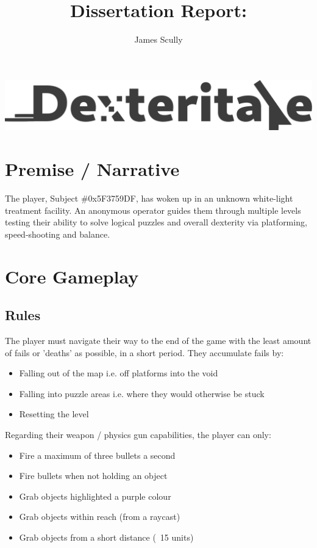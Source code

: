 \documentclass[11pt]{article}
\title{Dissertation Report: \pt}
\author{James Scully}
\begin{document}
\begin{center}
\includegraphics[width=0.75\linewidth]{logo} 
\end{center}

\section{Premise / Narrative}
The player, Subject \#0x5F3759DF, has woken up in an unknown white-light treatment facility. An anonymous operator guides them through multiple levels testing their ability to solve logical puzzles and overall dexterity via platforming, speed-shooting and balance.



\section{Core Gameplay}
\subsection{Rules}
The player must navigate their way to the end of the game with the least amount of fails or 'deaths' as possible, in a short period. They accumulate fails by: 

\begin{itemize}
	\item Falling out of the map i.e. off platforms into the void
	\item Falling into puzzle areas i.e. where they would otherwise be stuck
	\item Resetting the level \\
\end{itemize} 

Regarding their weapon / physics gun capabilities, the player can only:

\begin{itemize}
	\item Fire a maximum of three bullets a second
	\item Fire bullets when not holding an object
	\item Grab objects highlighted a purple colour
	\item Grab objects within reach (from a raycast)
	\item Grab objects from a short distance (~15 units) \\
	
\end{itemize}
\end{document}
